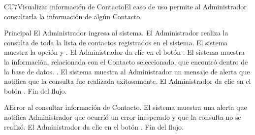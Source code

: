 
% 



	

	\begin{UseCase}{CU7}{Visualizar informaci\'on de Contacto}{El caso de uso permite al Administrador consultarla la informaci\'on de alg\'un Contacto.
	}
	\end{UseCase}

	\begin{UCtrayectoria}{Principal}
		\UCpaso[\UCactor] El Administrador ingresa al sistema.
		\UCpaso[\UCactor] El Administrador realiza la consulta de toda la lista de contactos registrados en el sistema.
		\UCpaso  El sistema muestra la opci\'on  y  .
		\UCpaso[\UCactor] El Administrador da clic en el bot\'on . 
		\UCpaso  El sistema muestra la informaci\'on, relacionada con el Contacto seleccionado, que encontr\'o dentro de la base de datos. .
		\UCpaso El sistema muestra al Administrador un mensaje de alerta que notifica que la consulta fue realizada exitosamente.
		\UCpaso[\UCactor] El Administrador da clic en el bot\'on . 	
		\UCpaso[] Fin del flujo.
				
	\end{UCtrayectoria}
		
		\begin{UCtrayectoriaA}{A}{Error al consultar informaci\'on de Contacto.}
			\UCpaso El sistema muestra una alerta que notifica Administrador que ocurri\'o un error inesperado y que la consulta no se realiz\'o.
			\UCpaso[\UCactor] El Administrador da clic en el bot\'on . 			
			\UCpaso[] Fin del flujo.
		\end{UCtrayectoriaA}		

